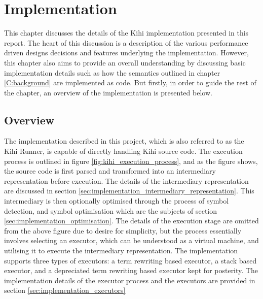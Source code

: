 \chapter{Implementation} \label{C:implementation} 
This chapter discusses the details of the Kihi implementation presented in this report. The heart of this discussion is a description of the various performance driven designs decisions and features underlying the implementation. However, this chapter also aims to provide an overall understanding by discussing basic implementation details such as how the semantics outlined in chapter \ref{C:background} are implemented as code. But firstly, in order to guide the rest of the chapter, an overview of the implementation is presented below.

\section{Overview}

The implementation described in this project, which is also referred to as the Kihi Runner, is capable of directly handling Kihi source code. The execution process is outlined in figure \ref{fig:kihi_execution_process}, and as the figure shows, the source code is first parsed and transformed into an intermediary representation before execution. The details of the intermediary representation are discussed in section \ref{sec:implementation_intermediary_representation}. This intermediary is then optionally optimised through the process of symbol detection, and symbol optimisation which are the subjects of section \ref{sec:implementation_optimisation}. The details of the execution stage are omitted from the above figure due to desire for simplicity, but the process essentially involves selecting an executor, which can be understood as a virtual machine, and utilising it to execute the intermediary representation. The implementation supports three types of executors: a term rewriting based executor, a stack based executor, and a depreciated term rewriting based executor kept for posterity. The implementation details of the executor process and the executors are provided in section \ref{sec:implementation_executors}


